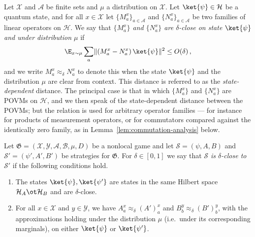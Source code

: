 \begin{definition}\label{def:povm-distance}
	Let $\mathcal X$ and $\mathcal A$ be finite sets and $\mu$ a distribution on $\mathcal X$. Let $\ket{\psi} \in \mathcal H$ be a quantum state, and for all $x \in \mathcal X$ let $\{M^x_a\}_{a \in \mathcal A}$ and $\{N^x_a\}_{a \in \mathcal A}$ be two families of linear operators on $\mathcal H$. We say that \emph{$\{M^x_a\}$ and $\{N^x_a\}$ are $\delta$-close on state $\ket{\psi}$ and under distribution $\mu$} if
	\[
		\E_{x \sim \mu} \sum_a \lVert (M^x_a - N^x_a)\, \ket{\psi} \rVert^2 \le O(\delta)\,,
	\]
	and we write $M^x_a \approx_\delta N^x_a$ to denote this when the state $\ket{\psi}$ and the distribution $\mu$ are clear from context. This distance is referred to as the \emph{state-dependent} distance. The principal case is that in which $\{M^x_a\}$ and $\{N^x_a\}$ are POVMs on $\mathcal H$, and we then speak of the state-dependent distance between the POVMs; but the relation is used for arbitrary operator families --- for instance for products of measurement operators, or for commutators compared against the identically zero family, as in Lemma~\ref{lem:commutation-analysis} below.
\end{definition}

\begin{definition}\label{def:strategy-distance}
	\leanok
	Let $\mathfrak G = (\mathcal X, \mathcal Y, \mathcal A, \mathcal B, \mu, D)$ be a nonlocal game and let $\mathcal S = (\psi, A, B)$ and $\mathcal S' = (\psi', A', B')$ be strategies for $\mathfrak G$. For $\delta \in [0,1]$ we say that \emph{$\mathcal S$ is $\delta$-close to $\mathcal S'$} if the following conditions hold.
	\begin{enumerate}
		\item The states $\ket{\psi}, \ket{\psi'}$ are states in the same Hilbert space $\mathcal H_A \ot \mathcal H_B$ and are $\delta$-close.
		\item For all $x \in \mathcal X$ and $y \in \mathcal Y$, we have $A^x_a \approx_\delta (A')^x_a$ and $B^y_b \approx_\delta (B')^y_b$, with the approximations holding under the distribution $\mu$ (i.e.\ under its corresponding marginals), on either $\ket{\psi}$ or $\ket{\psi'}$.
	\end{enumerate}
\end{definition}

